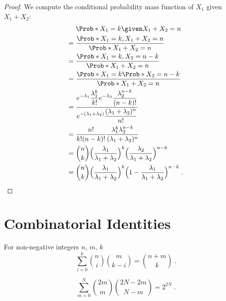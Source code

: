 \begin{proof}
We compute the conditional probability mass function of $X_1$ given $X_1+X_2$:
\begingroup
\addtolength{\jot}{1em}
\begin{align*}
    & \Prob*{X_1=k\given X_1+X_2=n}\\
={} & \frac{\Prob*{X_1=k,X_1+X_2=n}}{\Prob*{X_1+X_2=n}}\\
={} & \frac{\Prob*{X_1=k,X_2=n-k}}{\Prob*{X_1+X_2=n}}\\
={} & \frac{\Prob*{X_1=k}\Prob*{X_2=n-k}}{\Prob*{X_1+X_2=n}}\\
={} & \frac{\displaystyle
e^{-\lambda_1}\frac{\lambda_1^{k  }}{k!    } 
e^{-\lambda_2}\frac{\lambda_2^{n-k}}{(n-k)!}
}
{\displaystyle
e^{-(\lambda_1+\lambda_2)}\frac{(\lambda_1+\lambda_2)^n}{n!}
} \\
={} & \frac{n!}{k!(n-k)!}\frac{\lambda_1^k\lambda_2^{n-k}}{(\lambda_1+\lambda_2)^{n}} \\
={} & \binom{n}{k}\Bigl(\frac{\lambda_1}{\lambda_1+\lambda_2}\Bigr)^k
\Bigl(\frac{\lambda_2}{\lambda_1+\lambda_2}\Bigr)^{n-k}\\
={} & \binom{n}{k}\Bigl(\frac{\lambda_1}{\lambda_1+\lambda_2}\Bigr)^k
\Bigl(1-\frac{\lambda_1}{\lambda_1+\lambda_2}\Bigr)^{n-k}\;.
\end{align*}    
\endgroup
\end{proof}

\chapter{Combinatorial Identities}

\begin{fact}
For non-negative integers $n$, $m$, $k$
\[
\sum_{i=0}^{k} \binom{n}{i}\binom{m}{k-i} = \binom{n+m}{k} \;.
\]
\end{fact}

\begin{fact}
\[
\sum_{m=0}^{N} \binom{2m}{m}\binom{2N-2m}{N-m} = 2^{2N}\;.
\]    
\end{fact}
